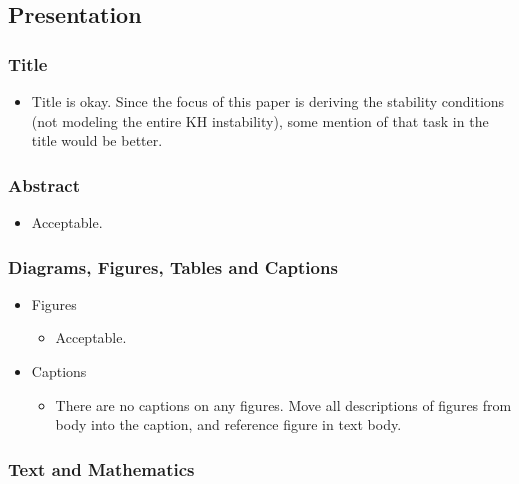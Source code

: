 \documentclass[10pt,letterpaper]{article}
\begin{document}
		\subsection{Presentation}
			\subsubsection{Title}
			
				\begin{itemize}
					\item Title is okay. Since the focus of this paper is deriving the stability conditions (not modeling the entire KH instability), some mention of that task in the title would be better.
				\end{itemize}
			
			\subsubsection{Abstract}
			
				\begin{itemize}
					\item Acceptable.
				\end{itemize}
			
			\subsubsection{Diagrams, Figures, Tables and Captions}
			
				\begin{itemize}
					\item Figures
					\begin{itemize}
						\item Acceptable.
					\end{itemize}
					\item Captions
					\begin{itemize}
						\item There are no captions on any figures. Move all descriptions of figures from body into the caption, and reference figure in text body.
					\end{itemize}
				\end{itemize}
			
			\subsubsection{Text and Mathematics}
			
\end{document}
